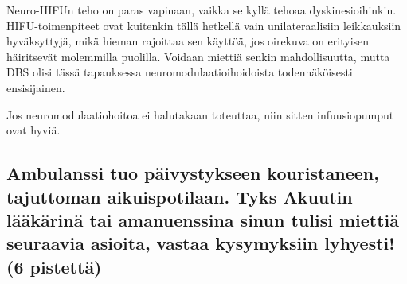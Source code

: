 \documentclass[
]{book}
\begin{document}
Neuro-HIFUn teho on paras vapinaan, vaikka se kyllä tehoaa dyskinesioihinkin. HIFU-toimenpiteet ovat kuitenkin tällä hetkellä vain unilateraalisiin leikkauksiin hyväksyttyjä, mikä hieman rajoittaa sen käyttöä, jos oirekuva on erityisen häiritsevät molemmilla puolilla. Voidaan miettiä senkin mahdollisuutta, mutta DBS olisi tässä tapauksessa neuromodulaatioihoidoista todennäköisesti ensisijainen.

Jos neuromodulaatiohoitoa ei halutakaan toteuttaa, niin sitten infuusiopumput ovat hyviä.

\subsection{Ambulanssi tuo päivystykseen kouristaneen, tajuttoman aikuispotilaan. Tyks Akuutin lääkärinä tai amanuenssina sinun tulisi miettiä seuraavia asioita, vastaa kysymyksiin lyhyesti! (6 pistettä)}\label{ambulanssi-tuo-puxe4ivystykseen-kouristaneen-tajuttoman-aikuispotilaan.-tyks-akuutin-luxe4uxe4kuxe4rinuxe4-tai-amanuenssina-sinun-tulisi-miettiuxe4-seuraavia-asioita-vastaa-kysymyksiin-lyhyesti-6-pistettuxe4}
\end{document}
